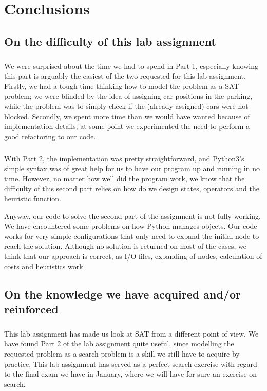 \chapter{Conclusions}
\label{chapter: conclusions}

\section{On the difficulty of this lab assignment}

\paragraph{}
We were surprised about the time we had to spend in Part 1, especially knowing
this part is arguably the easiest of the two requested for this lab assignment.
Firstly, we had a tough time thinking how to model the problem as a SAT problem;
we were blinded by the idea of assigning car positions in the parking, while the
problem was to simply check if the (already assigned) cars were not blocked.
Secondly, we spent more time than we would have wanted because of implementation
details; at some point we experimented the need to perform a good refactoring to
our code.

\paragraph{}
With Part 2, the implementation was pretty straightforward, and Python3's simple
syntax was of great help for us to have our program up and running in no time.
However, no matter how well did the program work, we know that the difficulty of
this second part relies on how do we design states, operators and the heuristic
function.

Anyway, our code to solve the second part of the assignment is not fully
working. We have encountered some problems on how Python manages objects. Our
code works for very simple configurations that only need to expand the initial
node to reach the solution. Although no solution is returned on most of the
cases, we think that our approach is correct, as I/O files, expanding of nodes,
calculation of costs and heuristics work.

\section{On the knowledge we have acquired and/or reinforced}

\paragraph{}
This lab assignment has made us look at SAT from a different point of view. We have found Part 2 of the lab assignment quite useful, since modelling the requested problem as a search problem is a skill we still have to acquire by practice. This lab assignment has served as a perfect search exercise with regard to the final exam we have in January, where we will have for sure an exercise on search.
